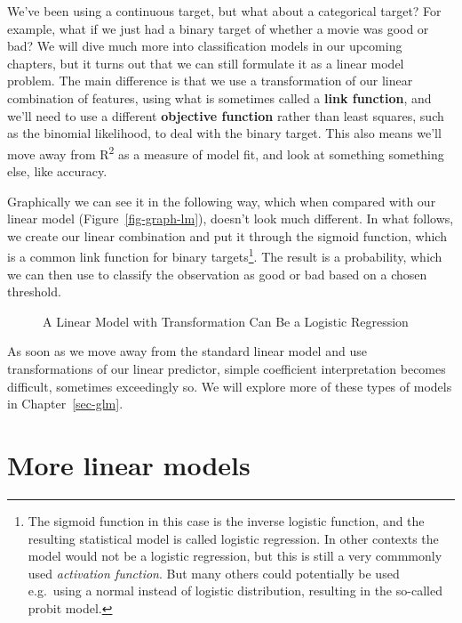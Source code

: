 \documentclass[
  letterpaper,
]{krantz}
\begin{document}
We've been using a continuous target, but what about a categorical
target? For example, what if we just had a binary target of whether a
movie was good or bad? We will dive much more into classification models
in our upcoming chapters, but it turns out that we can still formulate
it as a linear model problem. The main difference is that we use a
transformation of our linear combination of features, using what is
sometimes called a \textbf{link function}, and we'll need to use a
different \textbf{objective function} rather than least squares, such as
the binomial likelihood, to deal with the binary target. This also means
we'll move away from R\textsuperscript{2} as a measure of model fit, and
look at something something else, like accuracy.

Graphically we can see it in the following way, which when compared with
our linear model (Figure~\ref{fig-graph-lm}), doesn't look much
different. In what follows, we create our linear combination and put it
through the sigmoid function, which is a common link function for binary
targets\footnote{The sigmoid function in this case is the inverse
  logistic function, and the resulting statistical model is called
  logistic regression. In other contexts the model would not be a
  logistic regression, but this is still a very commmonly used
  \emph{activation function}. But many others could potentially be used
  e.g.~using a normal instead of logistic distribution, resulting in the
  so-called probit model.}. The result is a probability, which we can
then use to classify the observation as good or bad based on a chosen
threshold.

\begin{figure}[H]


\caption{\label{fig-graph-logistic}A Linear Model with Transformation
Can Be a Logistic Regression}

\end{figure}%

As soon as we move away from the standard linear model and use
transformations of our linear predictor, simple coefficient
interpretation becomes difficult, sometimes exceedingly so. We will
explore more of these types of models in Chapter~\ref{sec-glm}.

\section{More linear models}\label{sec-lm-more}
\end{document}
